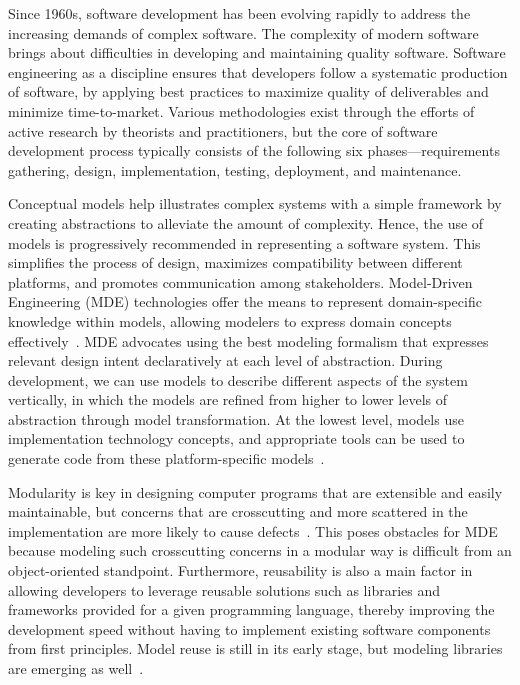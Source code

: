 
Since 1960s, software development has been evolving rapidly to address the increasing demands of complex software. The complexity of modern software brings about difficulties in developing and maintaining quality software. Software engineering as a discipline ensures that developers follow a systematic production of software, by applying best practices to maximize quality of deliverables and minimize time-to-market. Various methodologies exist through the efforts of active research by theorists and practitioners, but the core of software development process typically consists of the following six phases---requirements gathering, design, implementation, testing, deployment, and maintenance.

Conceptual models help illustrates complex systems with a simple framework by creating abstractions to alleviate the amount of complexity. Hence, the use of models is progressively recommended in representing a software system. This simplifies the process of design, maximizes compatibility between different platforms, and promotes communication among stakeholders. Model-Driven Engineering (MDE) technologies offer the means to represent domain-specific knowledge within models, allowing modelers to express domain concepts effectively~\cite{schmidt2006model}. MDE advocates using the best modeling formalism that expresses relevant design intent declaratively at each level of abstraction. During development, we can use models to describe different aspects of the system vertically, in which the models are refined from higher to lower levels of abstraction through model transformation. At the lowest level, models use implementation technology concepts, and appropriate tools can be used to generate code from these platform-specific models~\cite{sendall2003model}.

Modularity is key in designing computer programs that are extensible and easily maintainable, but concerns that are crosscutting and more scattered in the implementation are more likely to cause defects~\cite{eaddy2008crosscutting}. This poses obstacles for MDE because modeling such crosscutting concerns in a modular way is difficult from an object-oriented standpoint. Furthermore, reusability is also a main factor in allowing developers to leverage reusable solutions such as libraries and frameworks provided for a given programming language, thereby improving the development speed without having to implement existing software components from first principles. Model reuse is still in its early stage, but modeling libraries are emerging as well~\cite{france2012repository}.

